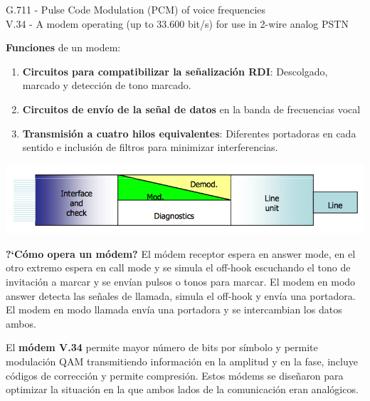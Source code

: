 \documentclass[10pt,portrait, twocolumn]{article}
\makeatletter
\renewcommand{\subsubsection}{\@startsection{subsubsection}{3}{0mm}%
                                {-1ex plus -.5ex minus -.2ex}%
                                {1ex plus .2ex}%
                                {\normalfont\small\bfseries}}
\makeatother
\begin{document}
\begin{center}
	{\scriptsize G.711 - Pulse Code Modulation (PCM) of voice frequencies\\
	V.34 - A modem operating (up to 33.600 bit/s) for use in 2-wire analog PSTN}
\end{center}

\textbf{Funciones} de un modem:

	\begin{enumerate}
		\item \textbf{Circuitos para compatibilizar la señalización RDI}: Descolgado, marcado y detección de tono marcado.
		\item \textbf{Circuitos de envío de la señal de datos} en la banda de frecuencias vocal
		\item \textbf{Transmisión a cuatro hilos equivalentes}: Diferentes portadoras en cada sentido e inclusión de filtros para minimizar interferencias.
	\end{enumerate}
	
	\begin{center}
		\includegraphics[scale=0.3]{images/FuncModem}
	\end{center}
	

\textbf{?`Cómo opera un módem?} El módem receptor espera en answer mode, en el otro extremo espera en call mode y se simula el off-hook escuchando el tono de invitación a marcar y se envían pulsos o tonos para marcar. El modem en modo answer detecta las señales de llamada, simula el off-hook y envía una portadora. El modem en modo llamada envía una portadora y se intercambian los datos ambos.


El \textbf{módem V.34} permite mayor número de bits por símbolo y permite modulación QAM transmitiendo información en la amplitud y en la fase, incluye códigos de corrección y permite compresión. Estos módems se diseñaron para optimizar la situación en la que ambos lados de la comunicación eran analógicos.
\end{document}
